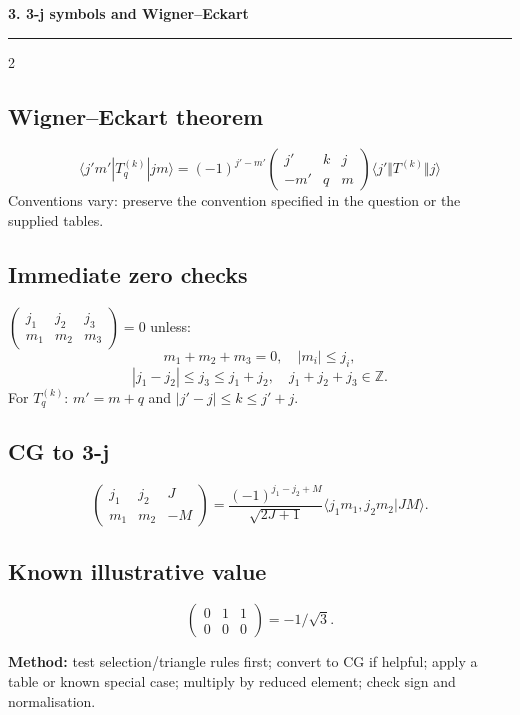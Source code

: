 
{\Large\bfseries\color{accent}3. 3-j symbols and Wigner--Eckart}
\hrule\smallskip
\begin{multicols}{2}
\subsection*{Wigner--Eckart theorem}
\[
\boxed{
\langle j'm'|T_q^{(k)}|jm\rangle
=(-1)^{j'-m'}
\begin{pmatrix}j'&k&j\\-m'&q&m\end{pmatrix}
\langle j'\Vert T^{(k)}\Vert j\rangle
}
\]
Conventions vary: preserve the convention specified
in the question or the supplied tables.
\subsection*{Immediate zero checks}
\(\begin{pmatrix}j_1&j_2&j_3\\m_1&m_2&m_3\end{pmatrix}=0\) unless:
\[
m_1+m_2+m_3=0,\quad |m_i|\le j_i,
\]
\[
|j_1-j_2|\le j_3\le j_1+j_2,
\quad j_1+j_2+j_3\in\mathbb Z.
\]
For \(T_q^{(k)}\): \(m'=m+q\) and
\(|j'-j|\le k\le j'+j\).
\subsection*{CG to 3-j}
\[
\begin{pmatrix}j_1&j_2&J\\m_1&m_2&-M\end{pmatrix}
=\frac{(-1)^{j_1-j_2+M}}{\sqrt{2J+1}}
\langle j_1m_1,j_2m_2|JM\rangle.
\]
\subsection*{Known illustrative value}
\[
\begin{pmatrix}0&1&1\\0&0&0\end{pmatrix}=-1/\sqrt3.
\]
\begin{methodbox}
\textbf{Method:} test selection/triangle rules first;
convert to CG if helpful; apply a table or known
special case; multiply by reduced element;
check sign and normalisation.
\end{methodbox}
\end{multicols}
